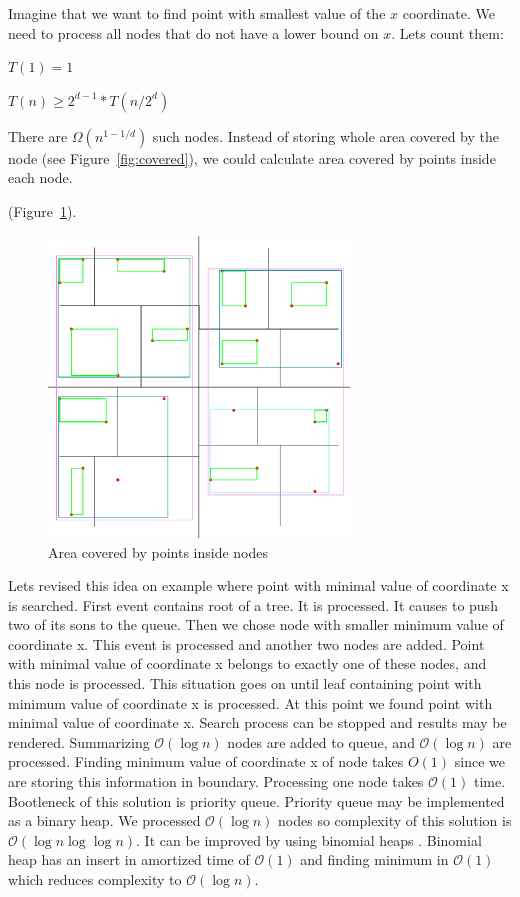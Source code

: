 \documentclass[10pt,a4paper]{article}
\newcommand{\Oh}{\mathcal{O}}
\begin{document}
Imagine that we want to find point with smallest value of the $x$ coordinate. We need to process all nodes
that do not have a lower bound on $x$. Lets count them:
\bigskip

$T(1) = 1$

$T(n) \geq 2^{d-1} * T(n/2^{d})$

\bigskip

There are $\Omega (n^{1-1/d})$ such nodes. Instead of storing whole area covered by the node (see Figure~\ref{fig:covered}), we could calculate area covered by points inside each node. 

 (Figure~\ref{fig:inside}).

\begin{figure}
\centering
  \includegraphics[width=8cm]{Figure2}
  \caption{Area covered by points inside nodes}
  \label{fig:inside}
\end{figure}

Lets revised this idea on example where point with minimal value of coordinate x is searched. First event contains root of a tree. It is processed. It causes to push two of its sons to the queue. Then we chose node with smaller minimum value of coordinate x. This event is processed and another two nodes are added. Point with minimal value of coordinate x belongs to exactly one of these nodes, and this node is processed. This situation goes on until leaf containing point with minimum value of coordinate x is processed. At this point we found point with minimal value of coordinate x. Search process can be stopped and results may be rendered. Summarizing $\Oh(\log n)$ nodes are added to queue, and $\Oh(\log n)$ are processed. Finding minimum value of coordinate x of node takes $O(1)$ since we are storing this information in boundary. Processing one node takes $\Oh(1)$ time. Bootleneck of this solution is priority queue. Priority queue may be implemented as a binary heap. We processed $\Oh(\log n)$ nodes so complexity of this solution is $\Oh(\log n \log \log n)$. It can be improved by using binomial heaps \cite{BINOMHEAPS}. Binomial heap has an insert in amortized time of $\Oh(1)$ and finding minimum in $\Oh(1)$ which reduces complexity to $\Oh(\log n)$.
\end{document}
